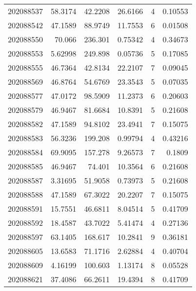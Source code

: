 \begin{tabular}{rrrrrr}
 202088537 &         58.3174  &       42.2208 &           26.6166  &           4 & 0.10553 \\
 202088542 &         47.1589  &       88.9749 &           11.7553  &           6 & 0.01508 \\
 202088550 &         70.066   &      236.301  &            0.75342 &           4 & 0.34673 \\
 202088553 &          5.62998 &      249.898  &            0.05736 &           5 & 0.17085 \\
 202088555 &         46.7364  &       42.8134 &           22.2107  &           7 & 0.09045 \\
 202088569 &         46.8764  &       54.6769 &           23.3543  &           5 & 0.07035 \\
 202088577 &         47.0172  &       98.5909 &           11.2373  &           6 & 0.20603 \\
 202088579 &         46.9467  &       81.6684 &           10.8391  &           5 & 0.21608 \\
 202088582 &         47.1589  &       94.8102 &           23.4941  &           7 & 0.15075 \\
 202088583 &         56.3236  &      199.208  &            0.99794 &           4 & 0.43216 \\
 202088584 &         69.9095  &      157.278  &            9.26573 &           7 & 0.1809  \\
 202088585 &         46.9467  &       74.401  &           10.3564  &           6 & 0.21608 \\
 202088587 &          3.31695 &       51.9058 &            0.73973 &           5 & 0.21608 \\
 202088588 &         47.1589  &       67.3022 &           20.2207  &           7 & 0.15075 \\
 202088591 &         15.7551  &       46.6811 &            8.04514 &           5 & 0.41709 \\
 202088592 &         18.4587  &       43.7022 &            5.41474 &           4 & 0.27136 \\
 202088597 &         63.1405  &      168.617  &           10.2841  &           9 & 0.36181 \\
 202088605 &         13.6583  &       71.1716 &            2.62884 &           4 & 0.40704 \\
 202088609 &          4.16199 &      100.603  &            1.13174 &           8 & 0.05528 \\
 202088621 &         37.4086  &       66.2611 &           19.4394  &           8 & 0.41709 \\

\end{tabular}
